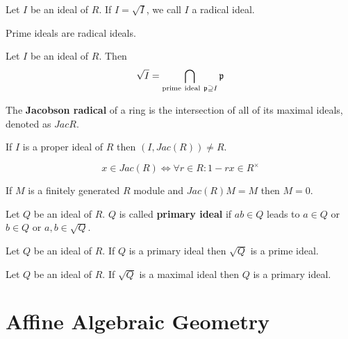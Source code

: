 \documentclass[12pt]{book}
\begin{document}
	\begin{definition}
		Let $I$ be an ideal of $R$. If $I=\sqrt I$, we call $I$ a radical ideal.
	\end{definition}
	
	\begin{lemma}
		Prime ideals are radical ideals.
	\end{lemma}
	
	\begin{theorem}
		Let $I$ be an ideal of $R$. Then
		\begin{equation}
			\sqrt I=\bigcap_{{\rm prime\ ideal\ }\mathfrak p\supseteq I}\mathfrak p
		\end{equation}
	\end{theorem}
	
	\begin{definition}
		The {\bf Jacobson radical} of a ring is the intersection of all of its maximal ideals, denoted as $Jac{R}$.
	\end{definition}
	
	\begin{lemma}
		If $I$ is a proper ideal of $R$ then $(I,Jac(R))\neq R$.
	\end{lemma}
	
	\begin{lemma}
		\begin{equation}
			x\in Jac(R) \iff \forall r\in R:1-rx\in R^\times
		\end{equation}
	\end{lemma}
	
	\begin{lemma}[Nakayama]
		If $M$ is a finitely generated $R$ module and $Jac(R)M=M$ then $M=0$.
	\end{lemma}
	
	\begin{definition}
		Let $Q$ be an ideal of $R$. $Q$ is called {\bf primary ideal} if $ab\in Q$ leads to $a\in Q$ or $b \in Q$ or $a,b\in\sqrt Q$.
	\end{definition}
	
	\begin{lemma}
		Let $Q$ be an ideal of $R$. If $Q$ is a primary ideal then $\sqrt Q$ is a prime ideal.
	\end{lemma}
	
	\begin{lemma}
		Let $Q$ be an ideal of $R$. If $\sqrt Q$ is a maximal ideal then $Q$ is a primary ideal.
	\end{lemma}
	\section{Affine Algebraic Geometry}
	
\end{document}

